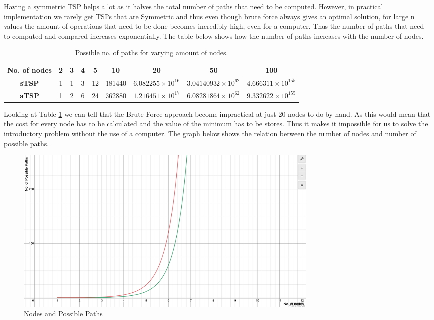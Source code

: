 \documentclass[a4paper]{article}
\begin{document}
Having a symmetric TSP helps a lot as it halves the total number of paths that need to be computed. However, in practical implementation we rarely get TSPs that are Symmetric and thus even though brute force always gives an optimal solution, for large n values the amount of operations that need to be done becomes incredibly high, even for a computer. Thus the number of paths that need to computed and compared increases exponentially. The table below shows how the number of paths increases with the number of nodes.
\begin{table}[H]
    \centering
    \begin{tabular}{|c|cccccccc|}
    \hline
    No. of nodes      &\textbf{2}&\textbf{3}&\textbf{4}&\textbf{5}&\textbf{10}&\textbf{20}&\textbf{50}&\textbf{100}\\
    \hline
    \textbf{sTSP}  & 1 & 1& 3 & 12 & 181440 & $6.082255\times10^{16}$ & $3.04140932\times10^{62}$ & $4.666311\times10^{155}$\\
    \textbf{aTSP}  & 1 &2& 6 & 24 & 362880 & $1.216451\times10^{17}$ & $6.08281864\times10^{62}$ &$9.332622\times10^{155}$\\
    \hline
    \end{tabular}
    \caption{Possible no. of paths for varying amount of nodes.}
    \label{tab:BruteForcePathsNumbers}
\end{table}
Looking at Table \ref{tab:BruteForcePathsNumbers} we can tell that the Brute Force approach become impractical at just 20 nodes to do by hand. As this would mean that the cost for every node has to be calculated and the value of the minimum has to be stores. Thus it makes it impossible for us to solve the introductory problem without the use of a computer. The graph below shows the relation between the number of nodes and number of possible paths. 
\begin{figure}[H]
    \centering
        \includegraphics[width=150mm,scale=0.5]{images/graphNodesAndPaths.png}
        \caption{Nodes and Possible Paths}
        \label{fig:nodesAndPaths}
\end{figure}
\end{document}
